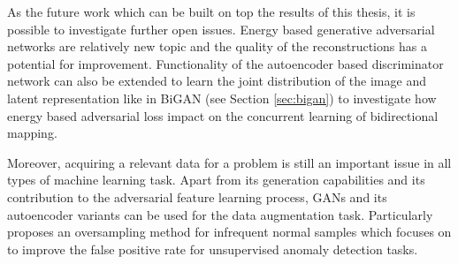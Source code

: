 {As the future work which can be built on top the results of this thesis, it is possible to investigate 
further open issues. Energy based generative adversarial networks are relatively new topic and the 
quality of the reconstructions has a potential for improvement. Functionality of the autoencoder based 
discriminator network can also be extended to learn the joint distribution of the image and latent 
representation like in BiGAN (see Section \ref{sec:bigan}) to investigate how energy based adversarial 
loss impact on the concurrent learning of bidirectional mapping. 

Moreover, acquiring a relevant data for a problem is still an important issue in all types of machine 
learning task. Apart from its generation capabilities and its contribution to the adversarial feature 
learning process, GANs and its autoencoder variants can be used for the data augmentation task.
Particularly \cite{DBLP:journals/corr/abs-1808-07632} proposes an oversampling method for infrequent 
normal samples which focuses on to improve the false positive rate for unsupervised anomaly detection tasks. 

} %
\endgroup
 
